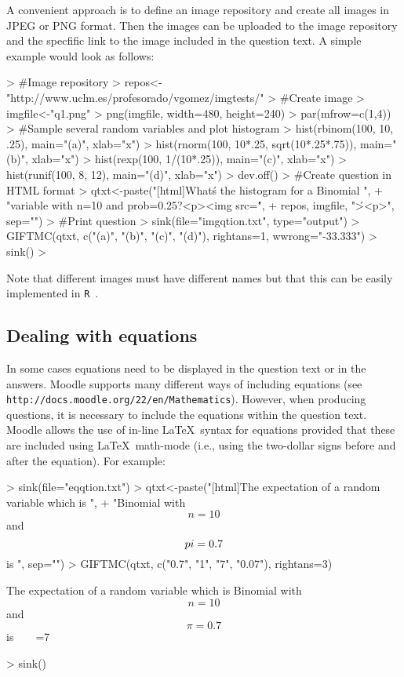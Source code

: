 \documentclass[a4paper]{article}
\newcommand{\RR}{\texttt{R}\ }
\begin{document}
A convenient approach is to define an image repository and create all images in
JPEG or PNG format. Then the images can be uploaded to the image repository and
the specfific link to the image included in the question text. A simple example
would look as follows:

\begin{Schunk}
\begin{Sinput}
> #Image repository
> repos<-"http://www.uclm.es/profesorado/vgomez/imgtests/"
> #Create image
> imgfile<-"q1.png"
> png(imgfile, width=480, height=240)
> par(mfrow=c(1,4))
> #Sample several random variables and plot histogram
> hist(rbinom(100, 10, .25), main="(a)", xlab="x")
> hist(rnorm(100, 10*.25, sqrt(10*.25*.75)), main="(b)", xlab="x")
> hist(rexp(100, 1/(10*.25)), main="(c)", xlab="x")
> hist(runif(100, 8, 12), main="(d)", xlab="x")
> dev.off()
> #Create question in HTML format
> qtxt<-paste("[html]What\'s the histogram for a Binomial ",
+    "variable with n=10 and prob=0.25?\n<p>\n<img src=\'", 
+    repos, imgfile, "\'>\n<p>", sep="")
> #Print question
> sink(file="imgqtion.txt", type="output")
> GIFTMC(qtxt, c("(a)", "(b)", "(c)", "(d)"), rightans=1, wwrong="-33.333")
> sink()
> 
\end{Sinput}
\end{Schunk}
\noindent
Note that different images must have different names but that this can
be easily implemented in \RR.



\subsection{Dealing with equations}

In some cases equations need to be displayed in the question text or in the answers.
Moodle supports many different ways of including equations (see 
\verb+http://docs.moodle.org/22/en/Mathematics+). However, when producing
questions, it is necessary to include the equations within the question text.
Moodle allows the use of in-line \LaTeX\ syntax for equations provided that
these are included using \LaTeX\ math-mode (i.e., using the two-dollar signs
before and after the equation). For example:


\begin{Schunk}
\begin{Sinput}
> sink(file="eqqtion.txt")
> qtxt<-paste("[html]The expectation of a random variable which is \n",
+    "Binomial with $$n=10$$ and $$\\pi=0.7$$ is ", sep="")
> GIFTMC(qtxt, c("0.7", "1", "7", "0.07"), rightans=3)
\end{Sinput}
\begin{Soutput}
[html]The expectation of a random variable which is 
Binomial with $$n=10$$ and $$\pi=0.7$$ is 
{
~%0%0.7
~%0%1
=7
~%0%0.07
}
\end{Soutput}
\begin{Sinput}
> sink()
\end{Sinput}
\end{Schunk}
\end{document}

